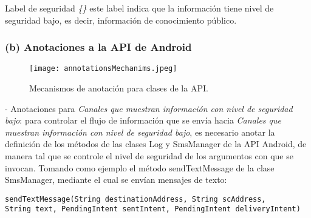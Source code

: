 Label de seguridad \emph{\{\}}\newline
este label indica que la información tiene nivel de seguridad bajo, es decir,
información de conocimiento público.

\subsubsection{(b) Anotaciones a la API de Android}

\begin{figure}[h!]
	\begin{center}
	\texttt{[image: annotationsMechanims.jpeg]}
	\end{center}
	\caption{Mecanismos de anotación para clases de la API.}
	\label{fig:annotationsMechanims}  
\end{figure}

- Anotaciones para \textit{Canales que muestran información con nivel de
seguridad bajo}: para controlar el flujo de información que se envía hacia
\textit{Canales que muestran información con nivel de seguridad bajo}, es
necesario anotar la definición de los métodos de las clases Log y SmsManager de
la API Android, de manera tal que se controle el nivel de seguridad de los
argumentos con que se invocan.\newline
Tomando como ejemplo el método sendTextMessage de la clase SmsManager, mediante
el cual se envían mensajes de texto:
\begin{lstlisting}
sendTextMessage(String destinationAddress, String scAddress, 
String text, PendingIntent sentIntent, PendingIntent deliveryIntent)
\end{lstlisting}


